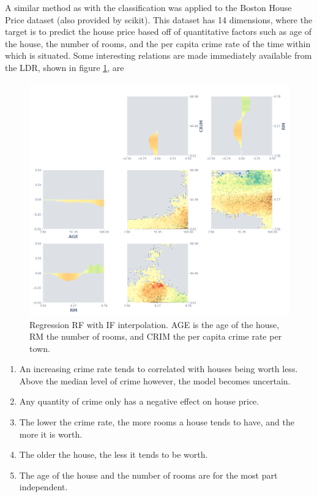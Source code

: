 \documentclass[a4paper, twocolumn]{article}
\begin{document}
A similar method as with the classification was applied to the Boston House Price dataset \cite{bostonhouse} (also provided by scikit). This dataset has 14 dimensions, where the target is to predict the house price based off of quantitative factors such as age of the house, the number of rooms, and the per capita crime rate of the time within which is situated. Some interesting relations are made immediately available from the LDR, shown in figure \ref{fig:reg-rf-if-matrix}, are

\begin{figure}
\centering
\includegraphics[width=\columnwidth]{img/reg_rf_if_matrix.png}
\caption{Regression RF with IF interpolation. AGE is the age of the house, RM the number of rooms, and CRIM the per capita crime rate per town.}
\label{fig:reg-rf-if-matrix}
\end{figure}

\begin{enumerate}
\item An increasing crime rate tends to correlated with houses being worth less. Above the median level of crime however, the model becomes uncertain.
\item Any quantity of crime only has a negative effect on house price.
\item The lower the crime rate, the more rooms a house tends to have, and the more it is worth.
\item The older the house, the less it tends to be worth.
\item The age of the house and the number of rooms are for the most part independent.
\end{enumerate}
\end{document}
